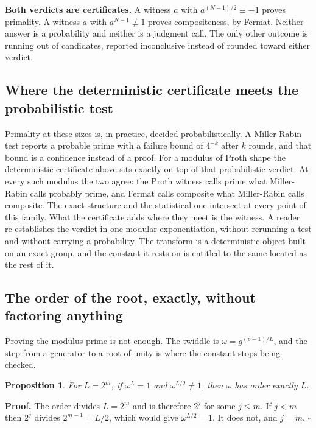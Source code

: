 \documentclass{article}
\newtheorem{proposition}{Proposition}
\begin{document}
\textbf{Both verdicts are certificates.} A witness \(a\) with \(a^{(N-1)/2} \equiv -1\) proves primality. A witness \(a\) with \(a^{N-1} \not\equiv 1\) proves compositeness, by Fermat. Neither answer is a probability and neither is a judgment call. The only other outcome is running out of candidates, reported inconclusive instead of rounded toward either verdict.

\subsection{Where the deterministic certificate meets the probabilistic test}

Primality at these sizes is, in practice, decided probabilistically. A Miller-Rabin test reports a probable prime with a failure bound of \(4^{-k}\) after \(k\) rounds, and that bound is a confidence instead of a proof. For a modulus of Proth shape the deterministic certificate above sits exactly on top of that probabilistic verdict. At every such modulus the two agree: the Proth witness calls prime what Miller-Rabin calls probably prime, and Fermat calls composite what Miller-Rabin calls composite. The exact structure and the statistical one intersect at every point of this family. What the certificate adds where they meet is the witness. A reader re-establishes the verdict in one modular exponentiation, without rerunning a test and without carrying a probability. The transform is a deterministic object built on an exact group, and the constant it rests on is entitled to the same located as the rest of it.

\subsection{The order of the root, exactly, without factoring anything}

Proving the modulus prime is not enough. The twiddle is \(\omega = g^{(p-1)/L}\), and the step from a generator to a root of unity is where the constant stops being checked.

\begin{proposition}
For \(L = 2^m\), if \(\omega^L = 1\) and \(\omega^{L/2} \ne 1\), then \(\omega\) has order exactly \(L\).
\end{proposition}

\textbf{Proof.} The order divides \(L = 2^m\) and is therefore \(2^j\) for some \(j \le m\). If \(j < m\) then \(2^j\) divides \(2^{m-1} = L/2\), which would give \(\omega^{L/2} = 1\). It does not, and \(j = m\). \(\square\)
\end{document}

